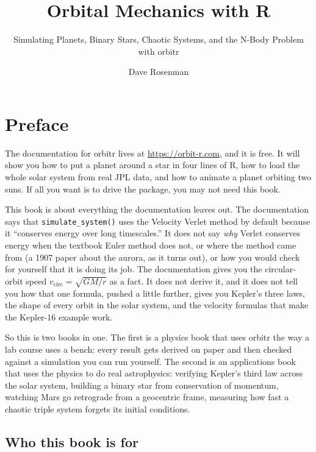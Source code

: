 \documentclass[
  10.5pt,
  letterpaper,
]{scrbook}
\title{Orbital Mechanics with R}
\subtitle{Simulating Planets, Binary Stars, Chaotic Systems, and the
N-Body Problem with orbitr}
\author{Dave Rosenman}
\date{}
\renewcommand*\contentsname{Table of contents}
\newcommand\contentsname{Table of contents}
\theoremstyle{plain}
\theoremstyle{remark}
\begin{document}
\frontmatter
\maketitle

\renewcommand*\contentsname{Table of contents}
{
\setcounter{tocdepth}{1}
\tableofcontents
}

\mainmatter
{}

\chapter*{Preface}\label{preface}


The documentation for orbitr lives at \url{https://orbit-r.com}, and it
is free. It will show you how to put a planet around a star in four
lines of R, how to load the whole solar system from real JPL data, and
how to animate a planet orbiting two suns. If all you want is to drive
the package, you may not need this book.

This book is about everything the documentation leaves out. The
documentation says that \texttt{simulate\_system()} uses the Velocity
Verlet method by default because it ``conserves energy over long
timescales.'' It does not say \emph{why} Verlet conserves energy when
the textbook Euler method does not, or where the method came from (a
1907 paper about the aurora, as it turns out), or how you would check
for yourself that it is doing its job. The documentation gives you the
circular-orbit speed \(v_{\mathrm{circ}} = \sqrt{GM/r}\) as a fact. It
does not derive it, and it does not tell you how that one formula,
pushed a little further, gives you Kepler's three laws, the shape of
every orbit in the solar system, and the velocity formulas that make the
Kepler-16 example work.

So this is two books in one. The first is a physics book that uses
orbitr the way a lab course uses a bench: every result gets derived on
paper and then checked against a simulation you can run yourself. The
second is an applications book that uses the physics to do real
astrophysics: verifying Kepler's third law across the solar system,
building a binary star from conservation of momentum, watching Mars go
retrograde from a geocentric frame, measuring how fast a chaotic triple
system forgets its initial conditions.

\section*{Who this book is for}\label{who-this-book-is-for}
\end{document}
